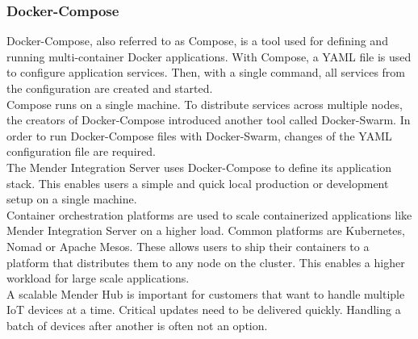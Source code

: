 \subsubsection{Docker-Compose} \label{docker-compose}
Docker-Compose, also referred to as Compose, is a tool used for defining and running multi-container Docker applications. With Compose, a YAML file is used to configure application services. Then, with a single command, all services from the configuration are created and started.\cite{docker-compose}\\
Compose runs on a single machine. To distribute services across multiple nodes, the creators of Docker-Compose introduced another tool called Docker-Swarm. In order to run Docker-Compose files with Docker-Swarm, changes of the YAML configuration file are required.\\
The Mender Integration Server uses Docker-Compose to define its application stack. This enables users a simple and quick local production or development setup on a single machine.\\
Container orchestration platforms are used to scale containerized applications like Mender Integration Server on a higher load. Common platforms are Kubernetes, Nomad or Apache Mesos. These allows users to ship their containers to a platform that distributes them to any node on the cluster. This enables a higher workload for large scale applications.\\
A scalable Mender Hub is important for customers that want to handle multiple IoT devices at a time. Critical updates need to be delivered quickly. Handling a batch of devices after another is often not an option.
